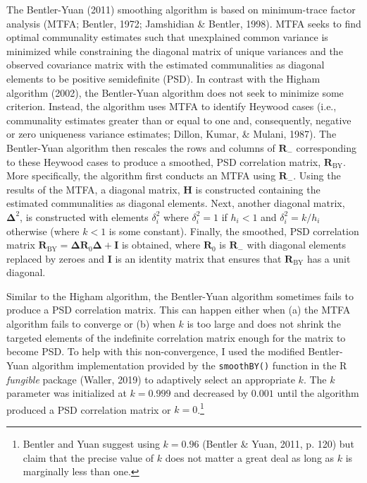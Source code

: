 \documentclass[
  english,
  man]{apa6}
\begin{document}
The Bentler-Yuan (2011) smoothing algorithm is based on minimum-trace factor analysis (MTFA; Bentler, 1972; Jamshidian \& Bentler, 1998). MTFA seeks to find optimal communality estimates such that unexplained common variance is minimized while constraining the diagonal matrix of unique variances and the observed covariance matrix with the estimated communalities as diagonal elements to be positive semidefinite (PSD). In contrast with the Higham algorithm (2002), the Bentler-Yuan algorithm does not seek to minimize some criterion. Instead, the algorithm uses MTFA to identify Heywood cases (i.e., communality estimates greater than or equal to one and, consequently, negative or zero uniqueness variance estimates; Dillon, Kumar, \& Mulani, 1987). The Bentler-Yuan algorithm then rescales the rows and columns of \(\mathbf{R}_{-}\) corresponding to these Heywood cases to produce a smoothed, PSD correlation matrix, \(\mathbf{R}_{\textrm{BY}}\). More specifically, the algorithm first conducts an MTFA using \(\mathbf{R}_{-}\). Using the results of the MTFA, a diagonal matrix, \(\mathbf{H}\) is constructed containing the estimated communalities as diagonal elements. Next, another diagonal matrix, \(\mathbf{\Delta}^2\), is constructed with elements \(\delta_i^2\) where \(\delta_i^2 = 1\) if \(h_i < 1\) and \(\delta_i^2 = k / h_i\) otherwise (where \(k < 1\) is some constant). Finally, the smoothed, PSD correlation matrix \(\mathbf{R}_{\textrm{BY}}= \mathbf{\Delta} \mathbf{R}_0 \mathbf{\Delta} + \mathbf{I}\) is obtained, where \(\mathbf{R}_0\) is \(\mathbf{R}_{-}\) with diagonal elements replaced by zeroes and \(\mathbf{I}\) is an identity matrix that ensures that \(\mathbf{R}_{\textrm{BY}}\) has a unit diagonal.

Similar to the Higham algorithm, the Bentler-Yuan algorithm sometimes fails to produce a PSD correlation matrix. This can happen either when (a) the MTFA algorithm fails to converge or (b) when \(k\) is too large and does not shrink the targeted elements of the indefinite correlation matrix enough for the matrix to become PSD. To help with this non-convergence, I used the modified Bentler-Yuan algorithm implementation provided by the \texttt{smoothBY()} function in the R \emph{fungible} package (Waller, 2019) to adaptively select an appropriate \(k\). The \(k\) parameter was initialized at \(k = 0.999\) and decreased by \(0.001\) until the algorithm produced a PSD correlation matrix or \(k = 0\).\footnote{Bentler and Yuan suggest using \(k = 0.96\) (Bentler \& Yuan, 2011, p. 120) but claim that the precise value of \(k\) does not matter a great deal as long as \(k\) is marginally less than one.}
\end{document}
